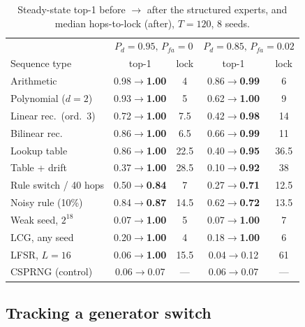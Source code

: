 \begin{table}[t]
\centering
\caption{Steady-state top-1 before $\to$ after the structured experts, and
median hops-to-lock (after), $T=120$, 8 seeds.}
\label{tab:structured}
\setlength{\tabcolsep}{3.5pt}
\begin{tabular}{lcc|cc}
\toprule
& \multicolumn{2}{c|}{$P_d{=}0.95,\,P_{fa}{=}0$} & \multicolumn{2}{c}{$P_d{=}0.85,\,P_{fa}{=}0.02$} \\
Sequence type & top-1 & lock & top-1 & lock \\
\midrule
Arithmetic            & 0.98$\to$\textbf{1.00} & 4    & 0.86$\to$\textbf{0.99} & 6 \\
Polynomial ($d{=}2$)  & 0.93$\to$\textbf{1.00} & 5    & 0.62$\to$\textbf{1.00} & 9 \\
Linear rec.\ (ord.\ 3)& 0.72$\to$\textbf{1.00} & 7.5  & 0.42$\to$\textbf{0.98} & 14 \\
Bilinear rec.         & 0.86$\to$\textbf{1.00} & 6.5  & 0.66$\to$\textbf{0.99} & 11 \\
Lookup table          & 0.86$\to$\textbf{1.00} & 22.5 & 0.40$\to$\textbf{0.95} & 36.5 \\
Table + drift         & 0.37$\to$\textbf{1.00} & 28.5 & 0.10$\to$\textbf{0.92} & 38 \\
Rule switch / 40 hops & 0.50$\to$\textbf{0.84} & 7    & 0.27$\to$\textbf{0.71} & 12.5 \\
Noisy rule (10\%)     & 0.84$\to$\textbf{0.87} & 14.5 & 0.62$\to$\textbf{0.72} & 13.5 \\
\midrule
Weak seed, $2^{18}$   & 0.07$\to$\textbf{1.00} & 5    & 0.07$\to$\textbf{1.00} & 7 \\
LCG, any seed         & 0.20$\to$\textbf{1.00} & 4    & 0.18$\to$\textbf{1.00} & 6 \\
LFSR, $L{=}16$        & 0.06$\to$\textbf{1.00} & 15.5 & 0.04$\to$0.12          & 61 \\
\midrule
CSPRNG (control)      & 0.06$\to$0.07          & ---  & 0.06$\to$0.07          & --- \\
\bottomrule
\end{tabular}
\end{table}

\subsection{Tracking a generator switch}
\label{sec:res-switch}

